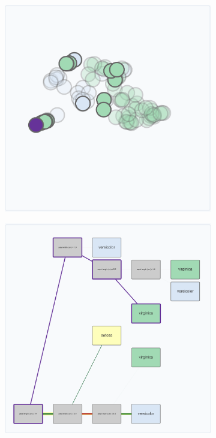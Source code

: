 \begin{figure}[htbp]
    \begin{subfigure}[c]{0.325\textwidth}
        \includegraphics[width=\linewidth]{images/teacherVariousInteractionsBlocksScatter2.png}
    \end{subfigure}
    \begin{subfigure}[c]{0.325\textwidth}
        \includegraphics[width=\linewidth]{images/teacherVariousInteractionsBlocks2.png}
    \end{subfigure}


\end{figure}
